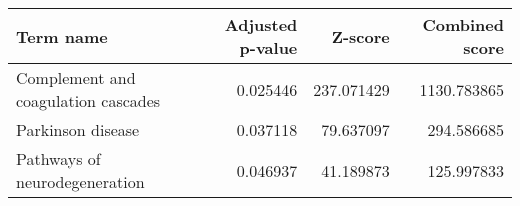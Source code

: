 \begin{tabular}{lrrr}
\toprule
                          Term name &  Adjusted p-value &    Z-score &  Combined score \\
\midrule
Complement and coagulation cascades &          0.025446 & 237.071429 &     1130.783865 \\
                  Parkinson disease &          0.037118 &  79.637097 &      294.586685 \\
      Pathways of neurodegeneration &          0.046937 &  41.189873 &      125.997833 \\
\bottomrule
\end{tabular}
